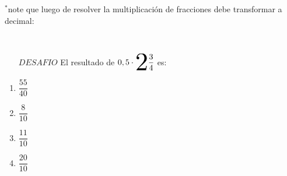 \documentclass[12pt]{article}
\begin{document}
\begin{enumerate}
\begin{enumerate}
		$^*$note que luego de resolver la multiplicación de fracciones debe transformar a decimal:
	\end{enumerate}
\ \\ 
 \begin{enumerate}
 	\item [$DESAFIO$]  El resultado de $0,5 \cdot \scalerel{2}{\dfrac{3}{4}}$ es: 
 \end{enumerate}
 	\begin{enumerate}
 		\item $\dfrac{55}{40}$\\
 		\item $\dfrac{8}{10}$\\
 		\item $\dfrac{11}{10}$\\
 		\item $\dfrac{20}{10}$\\
 	
 	\end{enumerate}

\end{enumerate}
\end{document}
